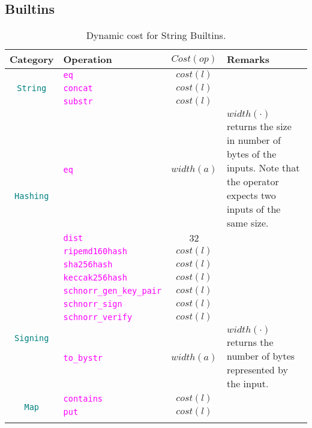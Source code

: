 \documentclass[9pt]{article}
\begin{document}
\subsection{Builtins}

\begin{table}[!hbt]
	\caption{Dynamic cost for String Builtins. \label{tab:string_builtins} }
\centering
	\begin{tabular}{|c|p{4.1cm}|c|p{5cm}|}
	\hline
		\textbf{Category} & \textbf{Operation} & \textbf{$Cost(op)$} & \textbf{Remarks} \\ \hline
		\multirow{3}{*}{\texttt{\textcolor{teal}{String}}} & \texttt{\textcolor{magenta}{eq}} & $cost(l)$  & \\
		\cline{2-4}
		 & \texttt{\textcolor{magenta}{concat}} & $cost(l)$  & \\ \cline{2-4}
		 & \texttt{\textcolor{magenta}{substr}} & $cost(l)$  & \\ \hline \hline
		\multirow{5}{*}{\texttt{\textcolor{teal}{Hashing}}} &
		  \texttt{\textcolor{magenta}{eq}} & $ width(a) $  & $width(\cdot)$
		  returns the size in number of bytes of the inputs. Note that the
		  operator expects two inputs of the same size.  \\ \cline{2-4}
		 & \texttt{\textcolor{magenta}{dist}} & $32$  & \\ \cline{2-4}
		 & \texttt{\textcolor{magenta}{ripemd160hash}} & $cost(l)$  & \\
		\cline{2-4}
		 & \texttt{\textcolor{magenta}{sha256hash}} & $cost(l)$  & \\ \cline{2-4}
		 & \texttt{\textcolor{magenta}{keccak256hash}} & $cost(l)$  & \\ \hline
		 \hline
		\multirow{4}{*}{\texttt{\textcolor{teal}{Signing}}} &
		\texttt{\textcolor{magenta}{schnorr\_gen\_key\_pair}} & $cost(l)$  & \\
		\cline{2-4}
		 & \texttt{\textcolor{magenta}{schnorr\_sign}} & $cost(l)$  & \\ \cline{2-4}
		 & \texttt{\textcolor{magenta}{schnorr\_verify}} & $cost(l)$  & \\
		 \cline{2-4}
		 & \texttt{\textcolor{magenta}{to\_bystr}} & $width(a)$  & $width(\cdot)$
		 returns
		 the number of
		 bytes represented
		 by the input.\\ \hline
		 \hline
		\multirow{6}{*}{\texttt{\textcolor{teal}{Map}}} &
		\texttt{\textcolor{magenta}{contains}} & $cost(l)$  & \\
		\cline{2-4}
		 & \texttt{\textcolor{magenta}{put}} & $cost(l)$  & \\ \cline{2-4}

\end{tabular}
\end{table}
\end{document}
